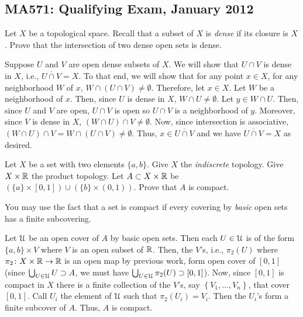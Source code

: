 \subsection{MA571: Qualifying Exam, January 2012}
\setcounter{exercise}{0}

\begin{problem}
Let $X$ be a topological space. Recall that a subset of $X$ is \emph{dense}
if its closure is $X$. Prove that the intersection of two dense open sets is
dense.
\end{problem}
\begin{solution}
Suppose $U$ and $V$ are open dense subsets of $X$. We will show that $U\cap
V$ is dense in $X$, i.e., $\overline{U\cap V}=X$. To that end, we will show
that for any point $x\in X$, for any neighborhood $W$ of $x$, $W\cap(U\cap
V)\neq\emptyset$. Therefore, let $x\in X$. Let $W$ be a neighborhood of
$x$. Then, since $U$ is dense in $X$, $W\cap U\neq\emptyset$. Let $y\in
W\cap U$. Then, since $U$ and $V$ are open, $U\cap V$ is open so $U\cap V$
is a neighborhood of $y$. Moreover, since $V$ is dense in $X$, $(W\cap
U)\cap V\neq\emptyset$. Now, since intersection is associative, $(W\cap
U)\cap V=W\cap(U\cap V)\neq\emptyset$. Thus, $x\in\overline{U\cap V}$ and
we have $\overline{U\cap V}=X$ as desired.
\end{solution}

\begin{problem}
Let $X$ be a set with two elements $\{a,b\}$. Give $X$ the
\emph{indiscrete} topology. Give $X\times\mathbb{R}$ the product topology. Let
$A\subset X\times\mathbb{R}$ be $(\{a\}\times[0,1])\cup(\{b\}\times(0,1))$. Prove
that $A$ is compact.

You may use the fact that a set is compact if every covering by
\emph{basic} open sets has a finite subcovering.
\end{problem}
\begin{solution}
Let $\mathcal{U}$ be an open cover of $A$ by basic open sets. Then each
$U\in\mathcal{U}$ is of the form $\{a,b\}\times V$ where $V$ is an open subset of
$\mathbb{R}$. Then, the $V$'s, i.e., $\pi_2(U)$ where $\pi_2\colon
X\times\mathbb{R}\to\mathbb{R}$ is an open map by previous work, form open cover of
$[0,1]$ (since $\bigcup_{U\in\mathcal{U}} U\supset A$, we must have
$\bigcup_{U\in\mathcal{U}}\pi_2(U)\supset[0,1]$). Now, since $[0,1]$ is compact
in $X$ there is a finite collection of the $V$'s, say
$\left\{V_1,\dotsc,V_n\right\}$, that cover $[0,1]$. Call $U_i$ the element of
$\mathcal{U}$ such that $\pi_2(U_i)=V_i$. Then the $U_i$'s form a finite subcover
of $A$. Thus, $A$ is compact.
\end{solution}

